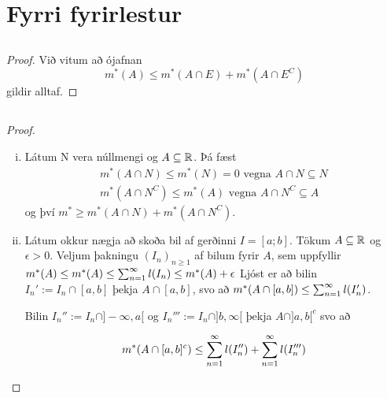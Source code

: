 \documentclass[12pt]{book}
\begin{document}
\section{Fyrri fyrirlestur}
\subsection{}
\begin{proof}
  Við vitum að ójafnan \[m^*(A) \leq m^*(A \cap E) + m^*(A \cap E^C) \]
  gildir alltaf.
  
\end{proof}

\subsection{}
\begin{proof}
  \begin{enumerate}[(i)]
  \item  Látum N vera núllmengi og $A \subseteq \mathbb{R}$. Þá fæst
    \begin{gather*}
      m^*(A\cap N) \leq m^*(N) = 0 \text{ vegna } A \cap N \subseteq N \\
      m^*(A \cap N^C) \leq m^*(A) \text{ vegna } A \cap N^C \subseteq A
    \end{gather*}
    og því $m^* \geq m^*(A \cap N) + m^*(A\cap N^C)$.


  \item Látum okkur nægja að skoða bil af gerðinni $I = [a;b]$. Tökum $A \subseteq \mathbb{R}$
    og $\epsilon > 0$. Veljum þakningu $(I_n)_{n\geq 1}$ af bilum fyrir $A$,
    sem uppfyllir $m^*(A) \leq m^*(A) \leq \sum_{n = 1}^{\infty} l(I_n) \leq m^*(A) + \epsilon$
    Ljóst er að bilin $I_n' := I_n \cap [a,b]$ þekja $A \cap [a,b]$, svo að
    $m^*(A \cap [a,b]) \leq \sum_{n = 1}^{\infty} l(I_n')$.

    Bilin $I_n'' := I_n \cap ]- \infty, a[$ og $I_n''' := I_n \cap ]b, \infty [ $
    þekja  $A \cap ]a,b[^c$ svo að

\[ m^*(A \cap [a,b]^c) \leq \sum_{n = 1}^{\infty} l(I_n'') + \sum_{n = 1}^{\infty} l(I_n''') \]
  \end{enumerate}
  
\end{proof}

  \subsection{}

\subsection{}
\end{document}

